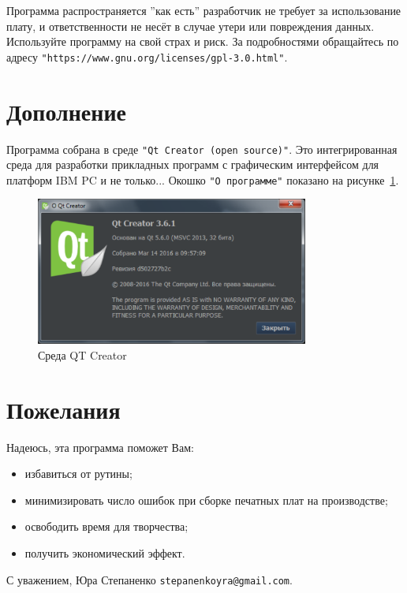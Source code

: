 Программа распространяется ''как есть'' разработчик не требует за использование плату, и ответственности не несёт в случае утери или повреждения данных. Используйте программу на свой страх и риск. За подробностями обращайтесь по адресу \verb|"https://www.gnu.org/licenses/gpl-3.0.html"|.




\section{Дополнение}

Программа собрана в среде \verb|"Qt Creator (open source)"|. Это интегрированная среда для разработки прикладных программ с графическим
интерфейсом для платформ IBM PC и не только... Окошко \verb|"О программе"| показано на рисунке~\ref{p:pic_about_qt}.

\begin{figure}[H]\center
  \includegraphics[width=0.8\textwidth]{VP_auto/pictures/pic_about_qt}
  \caption{Среда QT Creator} \label{p:pic_about_qt}
\end{figure}


\section{Пожелания}

Надеюсь, эта программа поможет Вам:
\begin{itemize}
  \item избавиться от рутины;
  \item минимизировать число ошибок при сборке печатных плат на производстве;
  \item освободить время для творчества;
  \item получить экономический эффект.
\end{itemize}


С уважением,    Юра Степаненко  \verb"stepanenkoyra@gmail.com".


